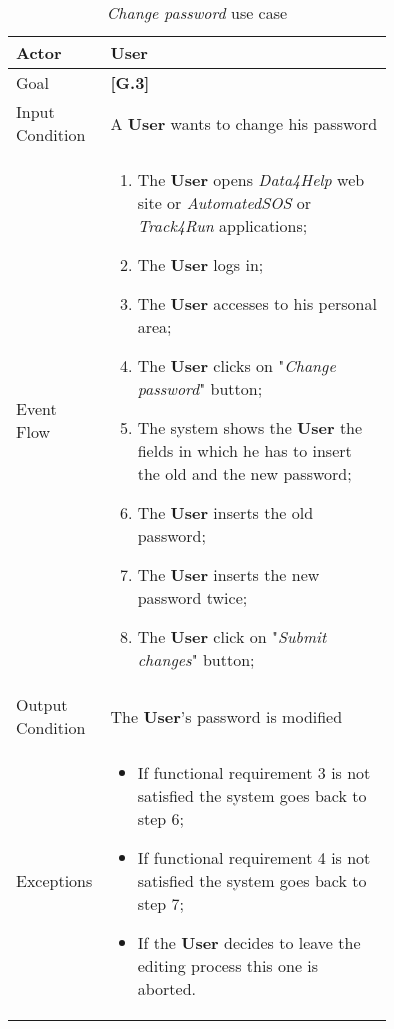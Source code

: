 \begin{center}
\begin{table}
\begin{tabular}{ | l | p{0.75\linewidth} | }
  \hline
    Actor & \textbf{User} \\ \hline
    Goal & \textbf{[G.3]} \\ \hline
    Input Condition & A \textbf{User} wants to change his password\\ \hline
    Event Flow & \begin{minipage}[t]{0.7\textwidth}
      \begin{enumerate}
        \item The \textbf{User} opens \textit{Data4Help} web site or \textit{AutomatedSOS} or \textit{Track4Run} applications;
        \item The \textbf{User} logs in;
        \item The \textbf{User} accesses to his personal area;
        \item The \textbf{User} clicks on "\textit{Change password}" button;
        \item The system shows the \textbf{User} the fields in which he has to insert the old and the new password;
        \item The \textbf{User} inserts the old password;
        \item The \textbf{User} inserts the new password twice;
        \item The \textbf{User} click on "\textit{Submit changes}" button;
      \end{enumerate}
    \smallskip
  \end{minipage} \\ \hline
  Output Condition & The \textbf{User}'s password is modified\\ \hline
  Exceptions & \begin{minipage}[t]{0.7\textwidth}
    \begin{itemize}
      \smallskip
      \item If functional requirement 3 is not satisfied the system goes back to step 6;
      \item If functional requirement 4 is not satisfied the system goes back to step 7;
      \item If the \textbf{User} decides to leave the editing process this one is aborted.
    \end{itemize}
    \smallskip
  \end{minipage}  \\ \hline
\end{tabular}
\caption{\textit{Change password} use case}
\label{table:changePassowrdTable}
\end{table}
\end{center}

